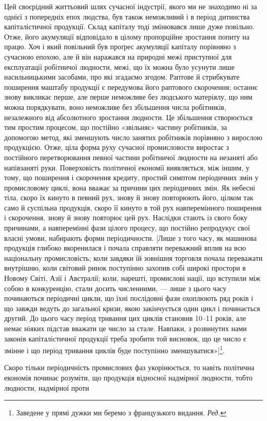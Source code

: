 
Цей своєрідний життьовий шлях сучасної індустрії, якого ми не
знаходимо ні за однієї з попередніх епох людства, був також
неможливий і в період дитинства капіталістичної продукції. Склад
капіталу тоді змінювався лише дуже повільно. Отже, його акумуляції
відповідало в цілому пропорційне зростання попиту на
працю. Хоч і який повільний був проґрес акумуляції капіталу
порівняно з сучасною епохою, але й він наражався на природні
межі приступної для експлуатації робітничої людности, межі, що
їх можна було усунути лише насильницькими засобами, про які
згадаємо згодом. Раптове й стрибкувате поширення маштабу
продукції є передумова його раптового скорочення; останнє
знову викликає перше, але перше неможливе без людського
матеріялу, що ним можна порядкувати, воно неможливе без
збільшення числа робітників, незалежного від абсолютного зростання
людности. Це збільшення створюється тим простим процесом,
що постійно «звільняє» частину робітників, за допомогою
метод, які зменшують число занятих робітників порівняно з
вирослою продукцією. Отже, ціла форма руху сучасної промисловости
виростає з постійного перетворювання певної частини
робітничої людности на незаняті або напівзаняті руки. Поверховість
політичної економії виявляється, між іншим, у тому, що
поширення і скорочення кредиту, простий симптом періодичних
змін у промисловому циклі, вона вважає за причини цих періодичних
змін. Як небесні тіла, скоро їх кинуто в певний рух,
знову й знову повторюють його, цілком так само й суспільна
продукція, скоро її кинуто в той рух навперемінного поширення
і скорочення, знову й знову повторює цей рух. Наслідки стають
із свого боку причинами, а навперемінні фази цілого процесу,
що постійно репродукує свої власні умови, набирають форми періодичности.
[Лише з того часу, як машинова продукція глибоко
вкоренилася і почала справляти переважний вплив на всю національну
промисловість; коли завдяки їй зовнішня торговля
почала переважати внутрішню, коли світовий ринок поступінно
захопив собі широкі простори в Новому Світі, Азії і Австралії;
коли, нарешті, промислові нації, що вступили між собою в конкуренцію,
стали досить численними, — лише з цього часу починаються
періодичні цикли, що їхні послідовні фази охоплюють
ряд років і що завжди ведуть до загальної кризи, якою закінчується
один цикл і починається другий. До цього часу період
тривання цих циклів становив 10--11 років, але немає ніяких
підстав вважати це число за стале. Навпаки, з розвинутих нами
законів капіталістичної продукції треба зробити той висновок,
що це число є змінне і що період тривання циклів буде поступінно
зменшуватися»]\footnote*{
Заведене у прямі дужки ми беремо з французького видання. \emph{Ред.}
}.

Скоро тільки періодичність промислових фаз укорінюється,
то навіть політична економія починає розуміти, що продукція
відносної надмірної людности, тобто людности, надмірної проти
\parbreak{}  %
